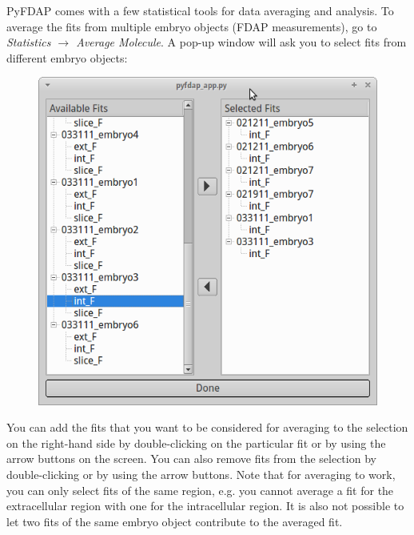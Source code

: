 \documentclass[a4paper,11pt]{article}
\begin{document}
PyFDAP comes with a few statistical tools for data averaging and analysis. To average the fits from multiple embryo objects (FDAP measurements), go to \textit{Statistics $\rightarrow$ Average Molecule}. A pop-up window will ask you to select fits from different embryo objects: 
\begin{figure}[H]
  \centering
  \includegraphics[scale=0.25]{figs/sel_fits.png}
 \end{figure}
\noindent You can add the fits that you want to be considered for averaging to the selection on the right-hand side by double-clicking on the particular fit or by using the arrow buttons on the screen. You can also remove fits from the selection by double-clicking or by using the arrow buttons. Note that for averaging to work, you can only select fits of the same region, e.g. you cannot average a fit for the extracellular region with one for the intracellular region. It is also not possible to let two fits of the same embryo object contribute to the averaged fit.
\end{document}

